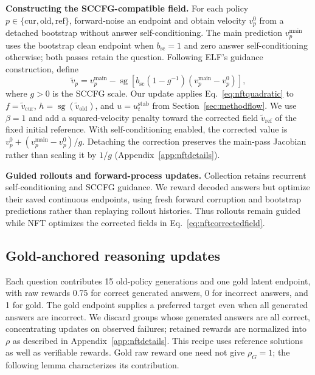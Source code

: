 \documentclass{article}
\newcommand{\sg}{\operatorname{sg}}
\begin{document}
\textbf{Constructing the SCCFG-compatible field.}
For each policy $p\in\{\mathrm{cur},\mathrm{old},\mathrm{ref}\}$, forward-noise an endpoint and obtain velocity $v_p^0$ from a detached bootstrap without answer self-conditioning. The main prediction $v_p^{\mathrm{main}}$ uses the bootstrap clean endpoint when $b_{\mathrm{sc}}=1$ and zero answer self-conditioning otherwise; both passes retain the question. Following ELF's guidance construction, define
\begin{equation}
 \widetilde v_p=v_p^{\mathrm{main}}-
 \sg\!\left[b_{\mathrm{sc}}(1-g^{-1})(v_p^{\mathrm{main}}-v_p^0)\right],
 \label{eq:nftcorrectedfield}
\end{equation}
where $g>0$ is the SCCFG scale. Our update applies Eq.~\eqref{eq:nftquadratic} to $f=\widetilde v_{\mathrm{cur}}$, $h=\sg(\widetilde v_{\mathrm{old}})$, and $u=u_t^{\mathrm{stab}}$ from Section~\ref{sec:methodflow}. We use $\beta=1$ and add a squared-velocity penalty toward the corrected field $\widetilde v_{\mathrm{ref}}$ of the fixed initial reference. With self-conditioning enabled, the corrected value is $v_p^0+(v_p^{\mathrm{main}}-v_p^0)/g$. Detaching the correction preserves the main-pass Jacobian rather than scaling it by $1/g$ (Appendix~\ref{app:nftdetails}).

\textbf{Guided rollouts and forward-process updates.}
Collection retains recurrent self-conditioning and SCCFG guidance. We reward decoded answers but optimize their saved continuous endpoints, using fresh forward corruption and bootstrap predictions rather than replaying rollout histories. Thus rollouts remain guided while NFT optimizes the corrected fields in Eq.~\eqref{eq:nftcorrectedfield}.

\subsection{Gold-anchored reasoning updates}
\label{sec:nftgold}

Each question contributes 15 old-policy generations and one gold latent endpoint, with raw rewards 0.75 for correct generated answers, 0 for incorrect answers, and 1 for gold. The gold endpoint supplies a preferred target even when all generated answers are incorrect. We discard groups whose generated answers are all correct, concentrating updates on observed failures; retained rewards are normalized into $\rho$ as described in Appendix~\ref{app:nftdetails}. This recipe uses reference solutions as well as verifiable rewards. Gold raw reward one need not give $\rho_G=1$; the following lemma characterizes its contribution.
\end{document}
